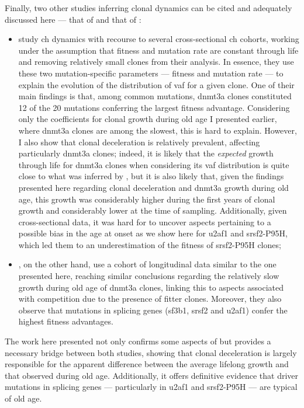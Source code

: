 Finally, two other studies inferring clonal dynamics can be cited and adequately discussed here --- that of  \cite{Watson2020-pz} and that of  \cite{Robertson2021-sw}:

\begin{itemize}
	\item {} study \ac{ch} dynamics with recourse to several cross-sectional \ac{ch} cohorts, working under the assumption that fitness and mutation rate are constant through life and removing relatively small clones from their analysis. In essence, they use these two mutation-specific parameters --- fitness and mutation rate --- to explain the evolution of the distribution of \ac{vaf} for a given clone. One of their main findings is that, among common mutations, \ac{dnmt3a} clones constituted 12 of the 20 mutations conferring the largest fitness advantage. Considering only the coefficients for clonal growth during old age I presented earlier, where \ac{dnmt3a} clones are among the slowest, this is hard to explain. However, I also show that clonal deceleration is relatively prevalent, affecting particularly \ac{dnmt3a} clones; indeed, it is likely that the \textit{expected} growth through life for \ac{dnmt3a} clones when considering its \ac{vaf} distribution is quite close to what was inferred by , but it is also likely that, given the findings presented here regarding clonal deceleration and \ac{dnmt3a} growth during old age, this growth was considerably higher during the first years of clonal growth and considerably lower at the time of sampling. Additionally, given cross-sectional data, it was hard for  to uncover aspects pertaining to a possible bias in the age at onset as we show here for \ac{u2af1} and \ac{srsf2}-P95H, which led them to an underestimation of the fitness of \ac{srsf2}-P95H clones;
	\item {}, on the other hand, use a cohort of longitudinal data similar to the one presented here, reaching similar conclusions regarding the relatively slow growth during old age of \ac{dnmt3a} clones, linking this to aspects associated with competition due to the presence of fitter clones. Moreover, they also observe that mutations in splicing genes (\ac{sf3b1}, \ac{srsf2} and \ac{u2af1}) confer the highest fitness advantages. 
\end{itemize}

The work here presented not only confirms some aspects of but provides a necessary bridge between both studies, showing that clonal deceleration is largely responsible for the apparent difference between the average lifelong growth and that observed during old age. Additionally, it offers definitive evidence that driver mutations in splicing genes --- particularly in \ac{u2af1} and \ac{srsf2}-P95H --- are typical of old age.

